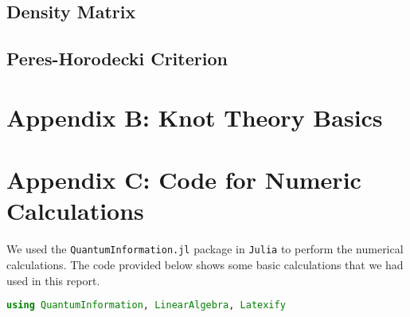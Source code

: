 \documentclass{scrartcl}
\begin{document}
\subsection{Density Matrix}
\subsection{Peres-Horodecki Criterion}
\newpage
\section*{Appendix B: {\huge Knot Theory Basics}}
\newpage

\section*{Appendix C: {\huge Code for Numeric Calculations}}
We used the \texttt{QuantumInformation.jl} package in \texttt{Julia} to perform the numerical calculations. The code provided below shows some basic calculations that we had used in this report. 
\begin{lstlisting}[language=Julia,label={lst:transmission}]
using QuantumInformation, LinearAlgebra, Latexify
\end{lstlisting}

\newpage

\end{document}
